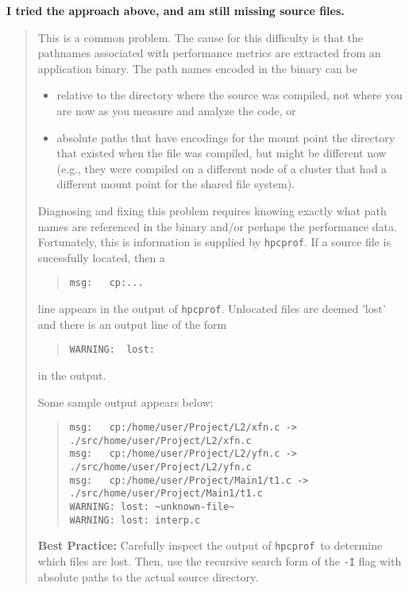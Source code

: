 \documentclass{article}
\newcommand{\hpcprof}{\texttt{hpcprof}}
\begin{document}
\textbf{I tried the approach above, and am still missing source files.}
\begin{quote}
This is a common problem. The cause for this difficulty is that the
pathnames associated with performance metrics are extracted from an
application binary. The path names encoded in the binary can be

\begin{itemize}
   \item relative to the directory where the source was compiled, not
         where you are now as you measure and analyze the code, or

   \item absolute paths that have encodings for the mount point the
         directory that existed when the file was compiled, but might be
         different now (e.g., they were compiled on a different node of a
         cluster that had a different mount point for the shared file
         system).
\end{itemize}

Diagnosing and fixing this problem requires knowing exactly what path
names are referenced in the binary and/or perhaps the performance
data. Fortunately, this is information is supplied by \hpcprof .
If a source file is sucessfully located, then a 
\begin{quote}
\verb|msg:   cp:...|
\end{quote}
line appears in the output of \hpcprof . Unlocated files are deemed 'lost'
and there is an output line of the form 
\begin{quote}
\verb|WARNING:  lost:|
\end{quote}
in the output.

Some sample output appears below:
\begin{quote}
\begin{verbatim}
msg:   cp:/home/user/Project/L2/xfn.c -> ./src/home/user/Project/L2/xfn.c
msg:   cp:/home/user/Project/L2/yfn.c -> ./src/home/user/Project/L2/yfn.c
msg:   cp:/home/user/Project/Main1/t1.c -> ./src/home/user/Project/Main1/t1.c
WARNING: lost: ~unknown-file~
WARNING: lost: interp.c
\end{verbatim}
\end{quote}

\textbf{Best Practice:} Carefully inspect the output of \hpcprof\ to determine which files are lost.
Then, use the recursive search form of the \verb|-I| flag with absolute paths to the actual source directory.
\end{quote}
\end{document}
